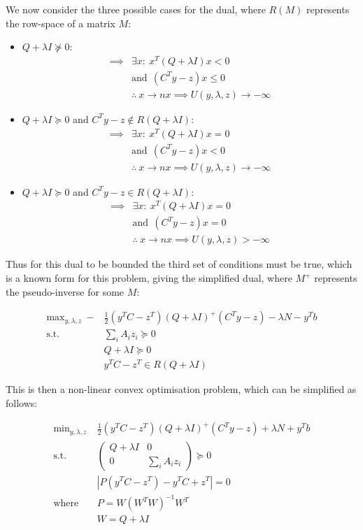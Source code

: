 \documentclass{article}
\begin{document}
We now consider the three possible cases for the dual, where $R(M)$ represents the row-space of a matrix $M$:

\begin{itemize}
\item $Q+\lambda I \not\succeq 0$:
	\begin{align}
		\implies &\exists x : ~ x^T (Q + \lambda I) x < 0 \\
				 &\text{and} ~~ (C^Ty-z)x \le 0 \\
		&\therefore ~ x \to n x \implies U(y, \lambda, z) \to -\infty
	\end{align}
\item $Q+\lambda I \succeq 0$ and $C^Ty-z \not \in R(Q+\lambda I)$:
	\begin{align}
		\implies &\exists x : ~ x^T (Q + \lambda I) x = 0 \\
				 &\text{and} ~~ (C^Ty-z)x < 0 \\
		&\therefore ~ x \to n x \implies U(y, \lambda, z) \to -\infty
	\end{align}
\item $Q+\lambda I \succeq 0$ and $C^Ty-z \in R(Q+\lambda I)$:
	\begin{align}
		\implies &\exists x : ~ x^T (Q + \lambda I) x = 0 \\
				 &\text{and} ~~ (C^Ty-z)x = 0 \\
				 &\therefore ~ x \to n x \implies U(y, \lambda, z) > -\infty
	\end{align}
\end{itemize}

Thus for this dual to be bounded the third set of conditions must be true, which is a known form for this problem, giving the simplified dual, where $M^+$ represents the pseudo-inverse for some $M$:

\begin{align}
	\text{max}_{y, \lambda, z} ~ -&\frac{1}{2} (y^T C - z^T) (Q+\lambda I)^+ (C^Ty - z) - \lambda N - y^T b \\ 
	\text{s.t.} ~~ &\sum_i A_i z_i \succeq 0 \\
				&Q+ \lambda I \succeq 0 \\
				&y^TC-z^T \in R(Q+\lambda I)
\end{align}

\pagebreak 

This is then a non-linear convex optimisation problem, which can be simplified as follows:

\begin{align}
	\text{min}_{y, \lambda, z} ~ &\frac{1}{2} (y^T C - z^T) (Q+\lambda I)^+ (C^Ty - z) + \lambda N + y^T b \\ 
	\text{s.t.} ~~ &\begin{pmatrix} Q+ \lambda I & 0 \\ 0 & \sum_i A_i z_i \end{pmatrix} \succeq 0 \\
			    &|P(y^TC-z^T)-y^T C+z^T| = 0 \\ 
				\text{where} ~~ &P = W (W^T W)^{-1} W^T \\
								&W = Q+\lambda I
\end{align}
\end{document}
